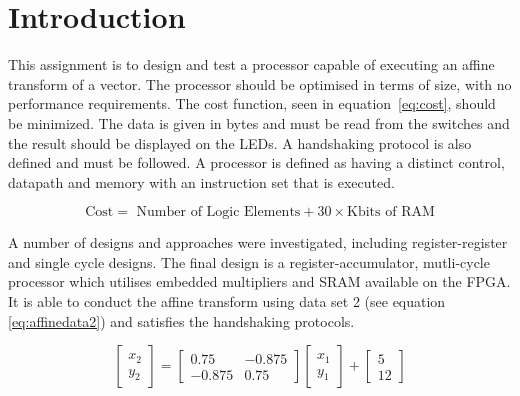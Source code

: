 
\section{Introduction}\label{sect:intro}

This assignment is to design and test a processor capable of executing an affine transform of a vector. 
The processor should be optimised in terms of size, with no performance requirements. 
The cost function, seen in equation~\eqref{eq:cost}, should be minimized. 
The data is given in bytes and must be read from the switches and the result should be displayed on the LEDs. 
A handshaking protocol is also defined and must be followed. 
A processor is defined as having a distinct control, datapath and memory with an instruction set that is executed. 

\begin{equation}\label{eq:cost}
\mbox{Cost} = \mbox{ Number of Logic Elements} + 30 \times \mbox{Kbits of RAM}
\end{equation}

A number of designs and approaches were investigated, including register-register and single cycle designs.
The final design is a register-accumulator, mutli-cycle processor which utilises embedded multipliers and SRAM available on the FPGA. 
It is able to conduct the affine transform using data set 2 (see equation \ref{eq:affinedata2}) and satisfies the handshaking protocols. 

\begin{equation}\label{eq:affinedata2}
\begin{bmatrix}
x_2 \\
y_2 
\end{bmatrix}
=
\begin{bmatrix}
0.75 & -0.875 \\
-0.875 & 0.75 
\end{bmatrix}
\begin{bmatrix}
x_1 \\
y_1
\end{bmatrix}
+
\begin{bmatrix}
5 \\
12
\end{bmatrix}
\end{equation}


